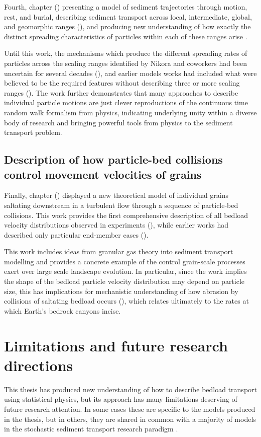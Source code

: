 Fourth, chapter () presenting a model of sediment trajectories through motion, rest, and burial, describing sediment transport across local, intermediate, global, and geomorphic ranges (), and producing new understanding of how exactly the distinct spreading characteristics of particles within each of these ranges arise \citep[e.g][]{Pretzlav2021}.

Until this work, the mechanisms which produce the different spreading rates of particles across the scaling ranges identified by Nikora and coworkers had been uncertain for several decades (), and earlier models works had included what were believed to be the required features without describing three or more scaling ranges (). 
The work further demonstrates that many approaches to describe individual particle motions are just clever reproductions of the continuous time random walk formalism from physics, indicating underlying unity within a diverse body of research and bringing powerful tools from physics to the sediment transport problem.

\subsection{Description of how particle-bed collisions control movement velocities of grains}

Finally, chapter () displayed a new theoretical model of individual grains saltating downstream in a turbulent flow through a sequence of particle-bed collisions.
This work provides the first comprehensive description of all bedload velocity distributions observed in experiments (), while earlier works had described only particular end-member cases ().

This work includes ideas from granular gas theory into sediment transport modelling and provides a concrete example of the control grain-scale processes exert over large scale landscape evolution. In particular, since the work implies the shape of the bedload particle velocity distribution may depend on particle size, this has implications for mechanistic understanding of how abrasion by collisions of saltating bedload occurs (), which relates ultimately to the rates at which Earth's bedrock canyons incise.

\section{Limitations and future research directions}

This thesis has produced new understanding of how to describe bedload transport using statistical physics, but its approach has many limitations deserving of future research attention.
In some cases these are specific to the models produced in the thesis, but in others, they are shared in common with a majority of models in the stochastic sediment transport research paradigm \citep{Ancey2020,Furbish2021a}.

